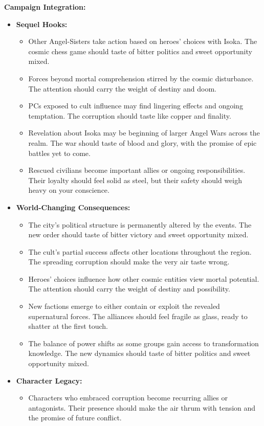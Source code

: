 \documentclass[11pt]{article}
\begin{document}
\textbf{Campaign Integration:}
\begin{itemize}
\item \textbf{Sequel Hooks:}
  \begin{itemize}
  \item Other Angel-Sisters take action based on heroes' choices with Isoka. The cosmic chess game should taste of bitter politics and sweet opportunity mixed.
  \item Forces beyond mortal comprehension stirred by the cosmic disturbance. The attention should carry the weight of destiny and doom.
  \item PCs exposed to cult influence may find lingering effects and ongoing temptation. The corruption should taste like copper and finality.
  \item Revelation about Isoka may be beginning of larger Angel Wars across the realm. The war should taste of blood and glory, with the promise of epic battles yet to come.
  \item Rescued civilians become important allies or ongoing responsibilities. Their loyalty should feel solid as steel, but their safety should weigh heavy on your conscience.
  \end{itemize}
\item \textbf{World-Changing Consequences:}
  \begin{itemize}
  \item The city's political structure is permanently altered by the events. The new order should taste of bitter victory and sweet opportunity mixed.
  \item The cult's partial success affects other locations throughout the region. The spreading corruption should make the very air taste wrong.
  \item Heroes' choices influence how other cosmic entities view mortal potential. The attention should carry the weight of destiny and possibility.
  \item New factions emerge to either contain or exploit the revealed supernatural forces. The alliances should feel fragile as glass, ready to shatter at the first touch.
  \item The balance of power shifts as some groups gain access to transformation knowledge. The new dynamics should taste of bitter politics and sweet opportunity mixed.
  \end{itemize}
\item \textbf{Character Legacy:}
  \begin{itemize}
  \item Characters who embraced corruption become recurring allies or antagonists. Their presence should make the air thrum with tension and the promise of future conflict.

\end{itemize}
\end{itemize}
\end{document}

